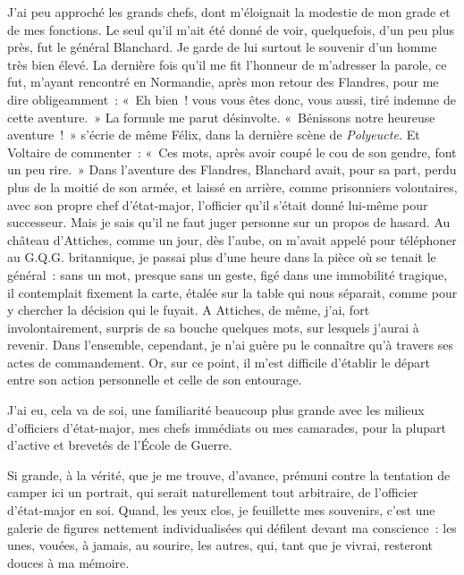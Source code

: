 \documentclass[french,twoside]{book} %
\begin{document}
J’ai peu approché les grands chefs, dont m’éloignait la modestie de mon grade et de mes fonctions. Le seul qu’il m’ait été donné de voir, quelquefois, d’un peu plus près, fut le général Blanchard. Je garde de lui surtout le souvenir d’un homme très bien élevé. La dernière fois qu’il me fit l’honneur de m’adresser la parole, ce fut, m’ayant rencontré en Normandie, après mon retour des Flandres, pour me dire obligeamment : « Eh bien ! vous vous êtes donc, vous aussi, tiré indemne de cette aventure. » La formule me parut désinvolte. « Bénissons notre heureuse aventure ! » s’écrie de même Félix, dans la dernière scène de {\itshape Polyeucte.} Et Voltaire de commenter : « Ces mots, après avoir coupé le cou de son gendre, font un peu rire. » Dans l’aventure des Flandres, Blanchard avait, pour sa part, perdu plus de la moitié de son armée, et laissé en arrière, comme prisonniers volontaires, avec son propre chef d’état-major, l’officier qu’il s’était donné lui-même pour successeur. Mais je sais qu’il ne faut juger personne sur un propos de hasard. Au château d’Attiches, comme un jour, dès l’aube, on m’avait appelé pour téléphoner au G.Q.G. britannique, je passai plus d’une heure dans la pièce où se tenait le général : sans un mot, presque sans un geste, figé dans une immobilité tragique, il contemplait fixement la carte, étalée sur la table qui nous séparait, comme pour y   chercher la décision qui le fuyait. A Attiches, de même, j’ai, fort involontairement, surpris de sa bouche quelques mots, sur lesquels j’aurai à revenir. Dans l’ensemble, cependant, je n’ai guère pu le connaître qu’à travers ses actes de commandement. Or, sur ce point, il m’est difficile d’établir le départ entre son action personnelle et celle de son entourage.\par
J’ai eu, cela va de soi, une familiarité beaucoup plus grande avec les milieux d’officiers d’état-major, mes chefs immédiats ou mes camarades, pour la plupart d’active et brevetés de l’École de Guerre.\par
Si grande, à la vérité, que je me trouve, d’avance, prémuni contre la tentation de camper ici un portrait, qui serait naturellement tout arbitraire, de l’officier d’état-major en soi. Quand, les yeux clos, je feuillette mes souvenirs, c’est une galerie de figures nettement individualisées qui défilent devant ma conscience : les unes, vouées, à jamais, au sourire, les autres, qui, tant que je vivrai, resteront douces à ma mémoire.\par
\end{document}
